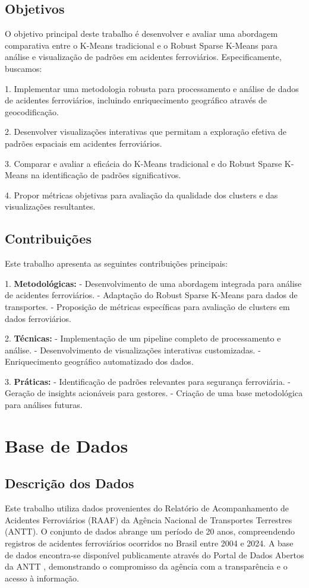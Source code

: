 \documentclass[conference]{IEEEtran}
\begin{document}
\subsection{Objetivos}
O objetivo principal deste trabalho é desenvolver e avaliar uma abordagem comparativa entre o K-Means tradicional e o Robust Sparse K-Means para análise e visualização de padrões em acidentes ferroviários. Especificamente, buscamos:

1. Implementar uma metodologia robusta para processamento e análise de dados de acidentes ferroviários, incluindo enriquecimento geográfico através de geocodificação.

2. Desenvolver visualizações interativas que permitam a exploração efetiva de padrões espaciais em acidentes ferroviários.

3. Comparar e avaliar a eficácia do K-Means tradicional e do Robust Sparse K-Means na identificação de padrões significativos.

4. Propor métricas objetivas para avaliação da qualidade dos clusters e das visualizações resultantes.

\subsection{Contribuições}
Este trabalho apresenta as seguintes contribuições principais:

1. \textbf{Metodológicas:}
   - Desenvolvimento de uma abordagem integrada para análise de acidentes ferroviários.
   - Adaptação do Robust Sparse K-Means para dados de transportes.
   - Proposição de métricas específicas para avaliação de clusters em dados ferroviários.

2. \textbf{Técnicas:}
   - Implementação de um pipeline completo de processamento e análise.
   - Desenvolvimento de visualizações interativas customizadas.
   - Enriquecimento geográfico automatizado dos dados.

3. \textbf{Práticas:}
   - Identificação de padrões relevantes para segurança ferroviária.
   - Geração de insights acionáveis para gestores.
   - Criação de uma base metodológica para análises futuras.

\section{Base de Dados}

\subsection{Descrição dos Dados}
Este trabalho utiliza dados provenientes do Relatório de Acompanhamento de Acidentes Ferroviários (RAAF) da Agência Nacional de Transportes Terrestres (ANTT). O conjunto de dados abrange um período de 20 anos, compreendendo registros de acidentes ferroviários ocorridos no Brasil entre 2004 e 2024. A base de dados encontra-se disponível publicamente através do Portal de Dados Abertos da ANTT \cite{b1}, demonstrando o compromisso da agência com a transparência e o acesso à informação.
\end{document}

